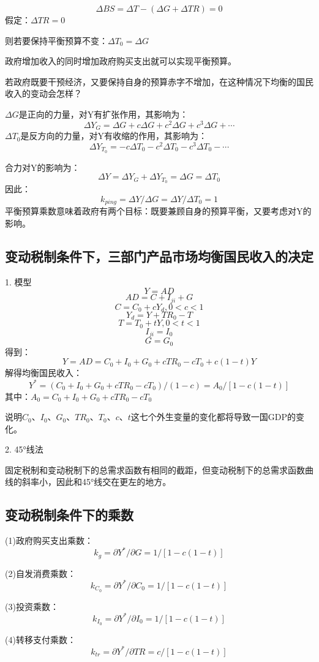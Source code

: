 \documentclass{article}
\begin{document}
\[
\Delta BS=\Delta T-(\Delta G+\Delta TR)=0
\]
假定：$ \Delta TR=0 $

则若要保持平衡预算不变：$ \Delta T_0=\Delta G $

政府增加收入的同时增加政府购买支出就可以实现平衡预算。

若政府既要干预经济，又要保持自身的预算赤字不增加，在这种情况下均衡的国民收入的变动会怎样？

$ \Delta G $是正向的力量，对Y有扩张作用，其影响为：
\[
\Delta Y_G=\Delta G+c\Delta G+c^2\Delta G+c^3\Delta G+\cdots
\]
$ \Delta T_0 $是反方向的力量，对Y有收缩的作用，其影响为：
\[
\Delta Y_{T_0}=-c\Delta T_0-c^2\Delta T_0-c^3\Delta T_0-\cdots
\]

合力对Y的影响为：
\[
\Delta Y=\Delta Y_G+\Delta Y_{T_0}=\Delta G=\Delta T_0
\]
因此：
\[
k_{ping}=\Delta Y/\Delta G=\Delta Y/\Delta T_0=1
\]
平衡预算乘数意味着政府有两个目标：既要兼顾自身的预算平衡，又要考虑对Y的影响。


\subsection{变动税制条件下，三部门产品市场均衡国民收入的决定}
1. 模型
\[
Y=AD
\]
\[
AD=C+I_{ji}+G
\]
\[
C=C_0+cY_d,0<c<1
\]
\[
Y_d=Y+TR_0-T
\]
\[
T=T_0+tY,0<t<1
\]
\[
I_{ji}=I_0
\]
\[
G=G_0
\]
得到：
\[
Y=AD=C_0+I_0+G_0+cTR_0-cT_0+c(1-t)Y
\]
解得均衡国民收入：
\[
Y^*=(C_0+I_0+G_0+cTR_0-cT_0)/(1-c)=A_0/[1-c(1-t)]
\]
其中：$ A_0=C_0+I_0+G_0+cTR_0-cT_0 $

说明$ C_0 $、$ I_0 $、$ G_0 $、$ TR_0 $、$ T_0 $、$ c $、$ t $这七个外生变量的变化都将导致一国GDP的变化。

\hspace*{\fill}

2. 45°线法

固定税制和变动税制下的总需求函数有相同的截距，但变动税制下的总需求函数曲线的斜率小，因此和45°线交在更左的地方。

\subsection{变动税制条件下的乘数}
(1)政府购买支出乘数：
\[ k_g=\partial Y^*/\partial G=1/[1-c(1-t)] \]

(2)自发消费乘数：
\[ k_{C_0}=\partial Y^*/\partial C_0=1/[1-c(1-t)] \]

(3)投资乘数：
\[ k_{I_0}=\partial Y^*/\partial I_0=1/[1-c(1-t)] \]

(4)转移支付乘数：
\[ k_{tr}=\partial Y^*/\partial TR=c/[1-c(1-t)] \]
\end{document}

